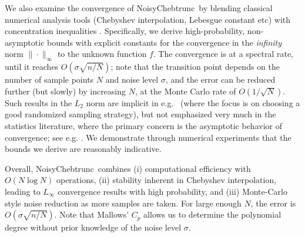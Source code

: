 \documentclass[final,onefignum,onetabnum]{siamart220329}
\def\mainalg{NoisyChebtrunc}
\begin{document}
We also examine the convergence of \mainalg\ by blending classical numerical analysis tools (Chebyshev interpolation, Lebesgue constant etc) with concentration inequalities \cite{wainwright2019high}.
Specifically, we derive high-probability, non-asymptotic bounds with explicit constants for the convergence in the \emph{infinity} norm $\|\cdot \|_\infty$ to the unknown function $f$.
The convergence is at a spectral rate, until it reaches 
$O(\sigma \sqrt{{n}/{N}})$; note that the transition point depends on the number of sample points $N$ and noise level $\sigma$, 
and the error can be reduced further (but slowly) by increasing $N$, at the Monte Carlo rate of $O(1/\sqrt{N})$. 
Such results {in the $L_2$ norm} are implicit in e.g.~\cite{cohen2013stability,migliorati2015convergence} (where the focus is on choosing a good randomized sampling strategy), but not emphasized very much in the statistics literature, where the primary concern is the asymptotic behavior of convergence; see e.g. \cite{tsybakov}. 
We demonstrate through numerical experiments that the bounds we derive are reasonably indicative. 



Overall, \mainalg\ 
combines (i) computational efficiency with $O(N\log N)$ operations, (ii) stability inherent in Chebyshev interpolation, leading to $L_\infty$ convergence results with high probability, 
and (iii) Monte-Carlo style noise reduction as more samples are taken. For large enough $N$, the error is $O(\sigma \sqrt{n/N})$. 
Note that Mallows' $C_p$ allows us to determine the polynomial degree without prior knowledge of the noise level $\sigma$. 
\end{document}
